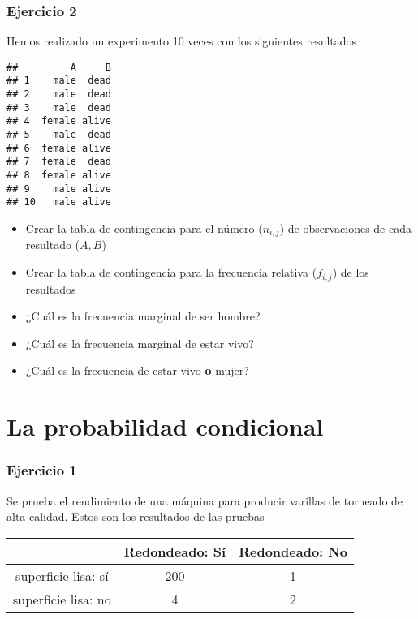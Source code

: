 \documentclass[
]{book}
\providecommand{\tightlist}{%
  \setlength{\itemsep}{0pt}\setlength{\parskip}{0pt}}
\begin{document}
\hypertarget{ejercicio-2-1}{%
\subsubsection{Ejercicio 2}\label{ejercicio-2-1}}

Hemos realizado un experimento 10 veces con los siguientes resultados

\begin{verbatim}
##         A     B
## 1    male  dead
## 2    male  dead
## 3    male  dead
## 4  female alive
## 5    male  dead
## 6  female alive
## 7  female  dead
## 8  female alive
## 9    male alive
## 10   male alive
\end{verbatim}

\begin{itemize}
\tightlist
\item
  Crear la tabla de contingencia para el número (\(n_{i,j}\)) de observaciones de cada resultado (\(A,B\))
\item
  Crear la tabla de contingencia para la frecuencia relativa (\(f_{i,j}\)) de los resultados
\item
  ¿Cuál es la frecuencia marginal de ser hombre?
\item
  ¿Cuál es la frecuencia marginal de estar vivo?
\item
  ¿Cuál es la frecuencia de estar vivo \textbf{o} mujer?
\end{itemize}

\hypertarget{la-probabilidad-condicional-2}{%
\section{La probabilidad condicional}\label{la-probabilidad-condicional-2}}

\hypertarget{ejercicio-1-2}{%
\subsubsection{Ejercicio 1}\label{ejercicio-1-2}}

Se prueba el rendimiento de una máquina para producir varillas de torneado de alta calidad. Estos son los resultados de las pruebas

\begin{longtable}[]{@{}ccc@{}}
\toprule
& Redondeado: Sí & Redondeado: No \\
\midrule
\endhead
superficie lisa: sí & 200 & 1 \\
superficie lisa: no & 4 & 2 \\
\bottomrule
\end{longtable}
\end{document}
